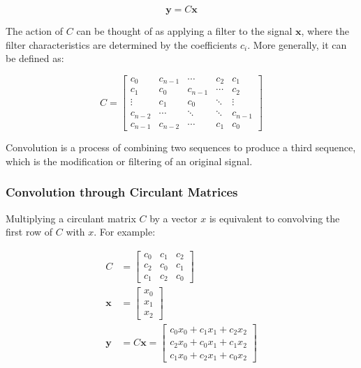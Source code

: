 \[
\mathbf{y} = C\mathbf{x}
\]

The action of \( C \) can be thought of as applying a filter to the signal \( \mathbf{x} \), where the filter characteristics are determined by the coefficients \( c_i \). More generally, it can be defined as:

\begin{equation}
C = \begin{bmatrix} 
c_0 & c_{n-1} & \cdots & c_2 & c_1 \\ 
c_1 & c_0 & c_{n-1} & \cdots & c_2 \\ 
\vdots & c_1 & c_0 & \ddots & \vdots \\ 
c_{n-2} & \cdots & \ddots & \ddots & c_{n-1} \\ 
c_{n-1} & c_{n-2} & \cdots & c_1 & c_0 
\end{bmatrix}
\end{equation}

Convolution is a process of combining two sequences to produce a third sequence, which is the modification or filtering of an original signal.

\subsubsection*{Convolution through Circulant Matrices}
Multiplying a circulant matrix \(C\) by a vector \(x\) is equivalent to convolving the first row of \(C\) with \(x\). For example:

\begin{align*}
C &= \begin{bmatrix} c_0 & c_1 & c_2 \\ c_2 & c_0 & c_1 \\ c_1 & c_2 & c_0 \end{bmatrix} \\
\textbf{x} &= \begin{bmatrix} x_0 \\ x_1 \\ x_2 \end{bmatrix} \\
\textbf{y} &= C\textbf{x} = \begin{bmatrix} 
c_0x_0 + c_1x_1 + c_2x_2 \\ 
c_2x_0 + c_0x_1 + c_1x_2 \\ 
c_1x_0 + c_2x_1 + c_0x_2 
\end{bmatrix}
\end{align*}

